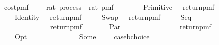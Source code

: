 \ cost{\isacharunderscore}pmf\ {\isacharcolon}{\isacharcolon}\ {\isachardoublequoteopen}{\isacharparenleft}\ \ \ rat{\isacharparenright}\ process\ {\isasymRightarrow}\ rat\ pmf{\isachardoublequoteclose}\isanewline
\ \ \isanewline
\ \ \ \ {\isachardoublequoteopen}\ {\isacharparenleft}Primitive\ \ {\isacharequal}\ return{\isacharunderscore}pmf\ \isanewline
\ \ {\isacharbar}\ {\isachardoublequoteopen}\ {\isacharparenleft}Identity\ \ {\isacharequal}\ return{\isacharunderscore}pmf\ {}{\isachardoublequoteclose}\isanewline
\ \ {\isacharbar}\ {\isachardoublequoteopen}\ {\isacharparenleft}Swap\ \ {\isacharequal}\ return{\isacharunderscore}pmf\ {}{\isachardoublequoteclose}\isanewline
\ \ {\isacharbar}\ {\isachardoublequoteopen}\ {\isacharparenleft}Seq\ \ {\isacharequal}\isanewline
\ \ \ \ \ \ \ \ {\isasymbind}\ {\isacharparenleft}{\isasymlambda}\ \ \ {\isasymbind}\ {\isacharparenleft}{\isasymlambda}\ return{\isacharunderscore}pmf\ {\isacharparenleft}\ {\isacharplus}\ \isanewline
\ \ {\isacharbar}\ {\isachardoublequoteopen}\ {\isacharparenleft}Par\ \ {\isacharequal}\isanewline
\ \ \ \ \ \ \ \ {\isasymbind}\ {\isacharparenleft}{\isasymlambda}\ \ \ {\isasymbind}\ {\isacharparenleft}{\isasymlambda}\ return{\isacharunderscore}pmf\ {\isacharparenleft}\ {\isacharplus}\ \isanewline
\ \ {\isacharbar}\ {\isachardoublequoteopen}\ {\isacharparenleft}Opt\ \ {\isacharequal}\ {\isacharparenleft}\ \ \ \isanewline
\ \ \ \ \ \ \ \ Some\ \ {\isasymRightarrow}\ \ {\isasymbind}\ case{\isacharunderscore}bchoice\ {\isacharparenleft}\ \ {\isacharparenleft}\ \isanewline
